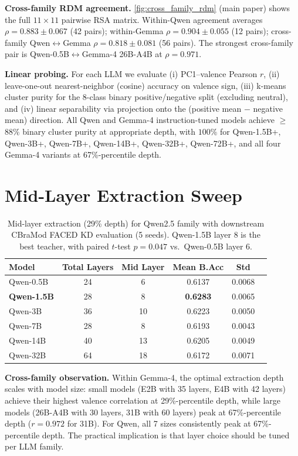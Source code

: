 \noindent\textbf{Cross-family RDM agreement.} \cref{fig:cross_family_rdm} (main paper) shows the full $11 \times 11$ pairwise RSA matrix. Within-Qwen agreement averages $\rho = 0.883 \pm 0.067$ (42 pairs); within-Gemma $\rho = 0.904 \pm 0.055$ (12 pairs); cross-family Qwen$\leftrightarrow$Gemma $\rho = 0.818 \pm 0.081$ (56 pairs). The strongest cross-family pair is Qwen-0.5B$\leftrightarrow$Gemma-4 26B-A4B at $\rho = 0.971$.

\noindent\textbf{Linear probing.} For each LLM we evaluate (i) PC1--valence Pearson $r$, (ii) leave-one-out nearest-neighbor (cosine) accuracy on valence sign, (iii) k-means cluster purity for the 8-class binary positive/negative split (excluding neutral), and (iv) linear separability via projection onto the (positive mean $-$ negative mean) direction. All Qwen and Gemma-4 instruction-tuned models achieve $\geq$$88\%$ binary cluster purity at appropriate depth, with $100\%$ for Qwen-1.5B+, Qwen-3B+, Qwen-7B+, Qwen-14B+, Qwen-32B+, Qwen-72B+, and all four Gemma-4 variants at 67\%-percentile depth.

\section{Mid-Layer Extraction Sweep}
\label{sec:supp_midlayer}

\begin{table}[!h]
\caption{Mid-layer extraction (29\% depth) for Qwen2.5 family with downstream CBraMod FACED KD evaluation (5 seeds). Qwen-1.5B layer 8 is the best teacher, with paired $t$-test $p = 0.047$ vs.\ Qwen-0.5B layer 6.}
\small
\centering
\begin{tabular}{lccccc}
\toprule
Model & Total Layers & Mid Layer & Mean B.Acc & Std \\
\midrule
Qwen-0.5B & 24 & 6 & 0.6137 & 0.0068 \\
\rowcolor{blond}
\textbf{Qwen-1.5B} & 28 & 8 & \textbf{0.6283} & 0.0065 \\
Qwen-3B & 36 & 10 & 0.6223 & 0.0050 \\
Qwen-7B & 28 & 8 & 0.6193 & 0.0043 \\
Qwen-14B & 40 & 13 & 0.6205 & 0.0049 \\
Qwen-32B & 64 & 18 & 0.6172 & 0.0071 \\
\bottomrule
\end{tabular}
\label{tab:supp_midlayer}
\end{table}

\noindent\textbf{Cross-family observation.} Within Gemma-4, the optimal extraction depth scales with model size: small models (E2B with 35 layers, E4B with 42 layers) achieve their highest valence correlation at 29\%-percentile depth, while large models (26B-A4B with 30 layers, 31B with 60 layers) peak at 67\%-percentile depth ($r = 0.972$ for 31B). For Qwen, all 7 sizes consistently peak at 67\%-percentile depth. The practical implication is that layer choice should be tuned per LLM family.

